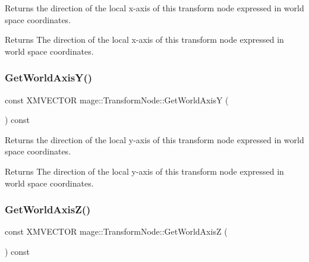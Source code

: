Returns the direction of the local x-\/axis of this transform node expressed in world space coordinates.

\begin{DoxyReturn}{Returns}
The direction of the local x-\/axis of this transform node expressed in world space coordinates. 
\end{DoxyReturn}
\hypertarget{structmage_1_1_transform_node_a94393cbc9a2a1270e2d52207233d6135}{}\label{structmage_1_1_transform_node_a94393cbc9a2a1270e2d52207233d6135} 
\subsubsection{\texorpdfstring{Get\+World\+Axis\+Y()}{GetWorldAxisY()}}
{\footnotesize\ttfamily const X\+M\+V\+E\+C\+T\+OR mage\+::\+Transform\+Node\+::\+Get\+World\+AxisY (\begin{DoxyParamCaption}{ }\end{DoxyParamCaption}) const\hspace{0.3cm}{\ttfamily [noexcept]}}

Returns the direction of the local y-\/axis of this transform node expressed in world space coordinates.

\begin{DoxyReturn}{Returns}
The direction of the local y-\/axis of this transform node expressed in world space coordinates. 
\end{DoxyReturn}
\hypertarget{structmage_1_1_transform_node_a1e404dbe189d7fd326c4816d987759b6}{}\label{structmage_1_1_transform_node_a1e404dbe189d7fd326c4816d987759b6} 
\subsubsection{\texorpdfstring{Get\+World\+Axis\+Z()}{GetWorldAxisZ()}}
{\footnotesize\ttfamily const X\+M\+V\+E\+C\+T\+OR mage\+::\+Transform\+Node\+::\+Get\+World\+AxisZ (\begin{DoxyParamCaption}{ }\end{DoxyParamCaption}) const\hspace{0.3cm}{\ttfamily [noexcept]}}

